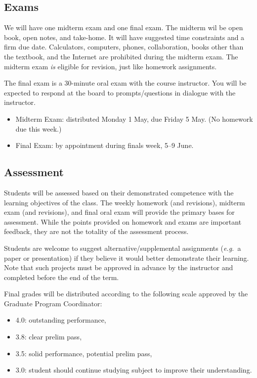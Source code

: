 \documentclass[11pt,twoside]{amsart}
\begin{document}
\subsection*{Exams}
We will have one midterm exam and one final exam. The midterm wil be open book, open notes, and take-home. It will have suggested time constraints and a firm due date. Calculators, computers, phones, collaboration, books other than the textbook, and the Internet are prohibited during the midterm exam. The midterm exam \emph{is} eligible for revision, just like homework assignments.

The final exam is a 30-minute oral exam with the course instructor. You will be expected to respond at the board to prompts/questions in dialogue with the instructor.

\begin{itemize}
\item Midterm Exam: distributed Monday 1 May, due Friday 5 May. (No homework due this week.)
\item Final Exam: by appointment during finals week, 5--9 June.
\end{itemize}

\subsection*{Assessment}%
Students will be assessed based on their demonstrated competence with the learning objectives of the class. The weekly homework (and revisions), midterm exam (and revisions), and final oral exam will provide the primary bases for assessment. While the points provided on homework and exams are important feedback, they are not the totality of the assessment process.

Students are welcome to suggest alternative/supplemental assignments (\emph{e.g.}~a paper or presentation) if they believe it would better demonstrate their learning. Note that such projects must be approved in advance by the instructor and completed before the end of the term.

Final grades will be distributed according to the following scale approved by the Graduate Program Coordinator:
\begin{itemize}
\item 4.0: outstanding performance,
\item 3.8: clear prelim pass,
\item 3.5: solid performance, potential prelim pass,
\item 3.0: student should continue studying subject to improve their understanding.
\end{itemize}
\end{document}
